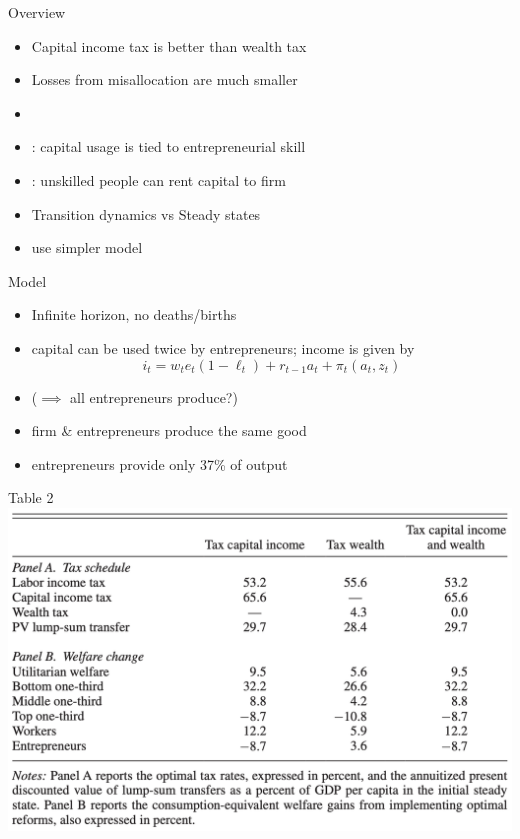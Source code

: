 \documentclass[aspectratio=169,mathserif]{beamer}
\begin{document}
\begin{frame}{Overview}
    \begin{itemize}
        \item Capital income tax is better than wealth tax
        \item Losses from misallocation are much smaller
        \item 
        \item \cite{guvenen2023use}: capital usage is tied to entrepreneurial skill
        \item \cite{boar2023income-or-wealth}: unskilled people can rent capital to firm
        \item Transition dynamics vs Steady states
        \item \cite{boar2023income-or-wealth} use simpler model
    \end{itemize}
    
\end{frame}
\begin{frame}{Model}

    \begin{itemize}
        \item Infinite horizon, no deaths/births
        \item capital can be used twice by entrepreneurs; income is given by
        \begin{equation*}
            i_t =  w_t e_t (1 - \ell_t) + r_{t-1} a_t + \pi_t(a_t, z_t)
        \end{equation*}
        \item ($\implies$ all entrepreneurs produce?)
        \item firm \& entrepreneurs produce the same good
        \item entrepreneurs provide only 37\% of output
       
    \end{itemize}
\end{frame}

\begin{frame}{Table 2}
    \centering
    \includegraphics[scale = 0.6]{BM_Tab_2.png}
\end{frame}
\end{document}
